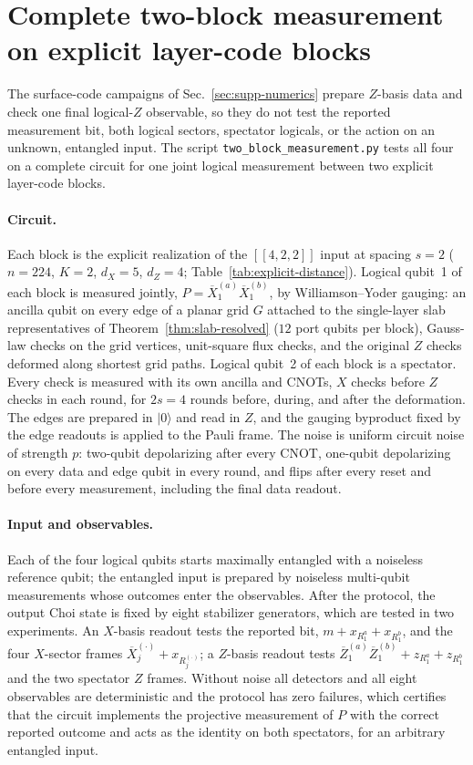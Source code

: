 \documentclass[aps,prx,reprint,superscriptaddress,nofootinbib,floatfix,longbibliography]{revtex4-2}
\theoremstyle{definition}
\begin{document}
\section{Complete two-block measurement on explicit layer-code blocks}
\label{sec:two-block}

The surface-code campaigns of Sec.~\ref{sec:supp-numerics} prepare $Z$-basis
data and check one final logical-$Z$ observable, so they do not test the
reported measurement bit, both logical sectors, spectator logicals, or the
action on an unknown, entangled input.  The script
\texttt{two\_block\_measurement.py} tests all four on a complete circuit for
one joint logical measurement between two explicit layer-code blocks.

\paragraph{Circuit.}
Each block is the explicit realization of the $[[4,2,2]]$ input at spacing
$s=2$ ($n=224$, $K=2$, $d_X=5$, $d_Z=4$; Table~\ref{tab:explicit-distance}).
Logical qubit~1 of each block is measured jointly, $P=\overline X_1^{(a)}
\overline X_1^{(b)}$, by Williamson--Yoder gauging: an ancilla qubit on every
edge of a planar grid $G$ attached to the single-layer slab representatives
of Theorem~\ref{thm:slab-resolved} ($12$ port qubits per block), Gauss-law
checks on the grid vertices, unit-square flux checks, and the original $Z$
checks deformed along shortest grid paths.  Logical qubit~2 of each block is
a spectator.  Every check is measured with its own ancilla and CNOTs, $X$
checks before $Z$ checks in each round, for $2s=4$ rounds before, during, and
after the deformation.  The edges are prepared in $|0\rangle$ and read in $Z$,
and the gauging byproduct fixed by the edge readouts is applied to the Pauli
frame.  The noise is uniform circuit noise of strength $p$:
two-qubit depolarizing after every CNOT, one-qubit depolarizing on every data
and edge qubit in every round, and flips after every reset and before every
measurement, including the final data readout.

\paragraph{Input and observables.}
Each of the four logical qubits starts maximally entangled with a noiseless
reference qubit; the entangled input is prepared by noiseless multi-qubit
measurements whose outcomes enter the observables.  After the protocol, the
output Choi state is fixed by eight stabilizer generators, which are tested in
two experiments.  An $X$-basis readout tests the reported bit,
$m+x_{R_1^a}+x_{R_1^b}$, and the four $X$-sector frames
$\overline X_j^{(\cdot)}+x_{R_j^{(\cdot)}}$; a $Z$-basis readout tests
$\overline Z_1^{(a)}\overline Z_1^{(b)}+z_{R_1^a}+z_{R_1^b}$ and the two
spectator $Z$ frames.  Without noise all detectors and all eight observables are
deterministic and the protocol has zero failures, which certifies that the
circuit implements the projective measurement of $P$ with the correct
reported outcome and acts as the identity on both spectators, for an
arbitrary entangled input.
\end{document}
